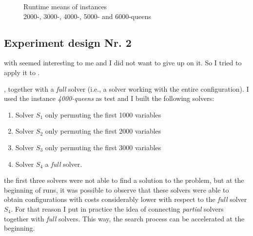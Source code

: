 \begin{figure}
\caption[]{Runtime means of instances \\2000-, 3000-, 4000-, 5000- and 6000-queens}
\label{fig:results_nq}
\end{figure}

\subsection{Experiment design Nr. 2}

 with \sgp{} seemed interesting to me and I did not want to give up on it. So I tried to apply it to \nqp. 

, together with a {\it full} solver (i.e., a solver working with the entire configuration). I used the instance \textit{4000-queens} as test and I built the following solvers:
\begin{enumerate}
\item Solver $S_1$ only permuting the first 1000 variables
\item Solver $S_2$ only permuting the first 2000 variables
\item Solver $S_3$ only permuting the first 3000 variables
\item Solver $S_4$ a {\it full} solver.
\end{enumerate}

 the first three solvers were not able to find a solution to the problem, but at the beginning of runs, it was possible to observe that these solvers were able to obtain configurations with costs considerably lower with respect to the {\it full} solver $S_4$. For that reason I put in practice the idea of connecting {\it partial} solvers together with {\it full} solvers. This way, the search process can be accelerated at the beginning.

